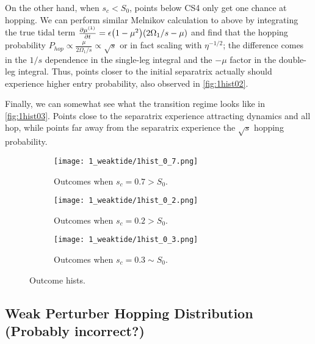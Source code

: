 \documentclass[11pt,
        usenames, %
        dvipsnames %
    ]{article}
\newcommand*{\pd}[2]{\frac{\partial#1}{\partial#2}}
\DeclarePairedDelimiter\p{\lparen}{\rparen}
\begin{document}
\begin{itemize}
        On the other hand, when $s_c < S_0$, points below CS4 only get one
        chance at hopping. We can perform similar Melnikov calculation to above
        by integrating the true tidal term $\pd{\mu^{(1)}}{t} = \epsilon\p*{1 -
        \mu^2}\p*{2\Omega_1/s - \mu}$ and find that the hopping probability
        $P_{hop} \propto \frac{\mu}{2\Omega_1/s} \propto \sqrt{s}$ or in fact
        scaling with $\eta^{-1/2}$; the difference comes in the $1/s$ dependence
        in the single-leg integral and the $-\mu$ factor in the double-leg
        integral. Thus, points closer to the initial separatrix actually should
        experience higher entry probability, also observed in
        \autoref{fig:1hist02}.

        Finally, we can somewhat see what the transition regime looks like in
        \autoref{fig:1hist03}. Points close to the separatrix experience
        attracting dynamics and all hop, while points far away from the
        separatrix experience the $\sqrt{s}$ hopping probability.
        \begin{figure}[t]
            \centering
            \begin{subfigure}{0.32\textwidth}
                \centering
                \texttt{[image: 1\_weaktide/1hist\_0\_7.png]}
                \caption{Outcomes when $s_c = 0.7 > S_0$.}\label{fig:1hist07}
            \end{subfigure}
            \begin{subfigure}{0.32\textwidth}
                \centering
                \texttt{[image: 1\_weaktide/1hist\_0\_2.png]}
                \caption{Outcomes when $s_c = 0.2 > S_0$.}\label{fig:1hist02}
            \end{subfigure}
            \begin{subfigure}{0.32\textwidth}
                \centering
                \texttt{[image: 1\_weaktide/1hist\_0\_3.png]}
                \caption{Outcomes when $s_c = 0.3 \sim S_0$.}\label{fig:1hist03}
            \end{subfigure}
            \caption{Outcome hists.}
        \end{figure}
\end{itemize}

\subsection{Weak Perturber Hopping Distribution (Probably incorrect?)}
\end{document}
